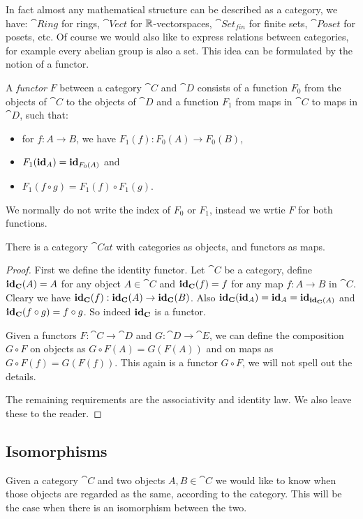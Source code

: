 In fact almost any mathematical structure can be described as a category, we have: $\cat{Ring}$ for rings, $\cat{Vect}$ for $\mathbb{R}$-vectorspaces, $\cat{Set_{fin}}$ for finite sets, $\cat{Poset}$ for posets, etc. Of course we would also like to express relations between categories, for example every abelian group is also a set. This idea can be formulated by the notion of a functor.

\begin{definition}
	A \emph{functor} $F$ between a category $\cat{C}$ and $\cat{D}$ consists of a function $F_0$ from the objects of $\cat{C}$ to the objects of $\cat{D}$ and a function $F_1$ from maps in $\cat{C}$ to maps in $\cat{D}$, such that:
	\begin{itemize}
		\item for $f: A \to B$, we have $F_1(f): F_0(A) \to F_0(B)$,
		\item $F_1(\mathbf{id}_A) = \mathbf{id}_{F_0(A)}$ and
		\item $F_1(f \circ g) = F_1(f) \circ F_1(g)$.
	\end{itemize}
	We normally do not write the index of $F_0$ or $F_1$, instead we wrtie $F$ for both functions.
\end{definition}

\begin{exlemma}
	There is a category $\cat{Cat}$ with categories as objects, and functors as maps.
\end{exlemma}
\begin{proof}
	First we define the identity functor. Let $\cat{C}$ be a category, define $\mathbf{id}_{\mathbf{C}}(A) = A$ for any object $A \in \cat{C}$ and $\mathbf{id}_{\mathbf{C}}(f) = f$ for any map $f: A \to B$ in $\cat{C}$. Cleary we have $\mathbf{id}_{\mathbf{C}}(f) : \mathbf{id}_{\mathbf{C}}(A) \to \mathbf{id}_{\mathbf{C}}(B)$. Also $\mathbf{id}_{\mathbf{C}}(\mathbf{id}_A) = \mathbf{id}_A = \mathbf{id}_{\mathbf{id}_{\mathbf{C}}(A)}$ and $\mathbf{id}_{\mathbf{C}}(f \circ g) = f \circ g$. So indeed $\mathbf{id}_{\mathbf{C}}$ is a functor.

	Given a functors $F: \cat{C} \to \cat{D}$ and $G: \cat{D} \to \cat{E}$, we can define the composition $G \circ F$ on objects as $G \circ F(A) = G(F(A))$ and on maps as $G \circ F(f) = G(F(f))$. This again is a functor $G \circ F$, we will not spell out the details.

	The remaining requirements are the associativity and identity law. We also leave these to the reader.
\end{proof}

\subsection{Isomorphisms}
Given a category $\cat{C}$ and two objects $A, B \in \cat{C}$ we would like to know when those objects are regarded as the same, according to the category. This will be the case when there is an isomorphism between the two.

